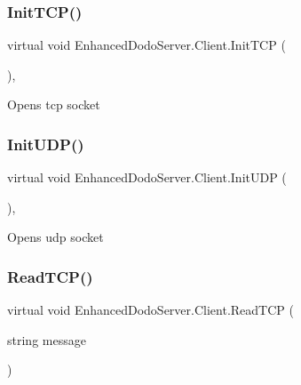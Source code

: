 \subsubsection{\texorpdfstring{InitTCP()}{InitTCP()}}
{\footnotesize\ttfamily virtual void Enhanced\+Dodo\+Server.\+Client.\+Init\+T\+CP (\begin{DoxyParamCaption}{ }\end{DoxyParamCaption})\hspace{0.3cm}{\ttfamily [protected]}, {\ttfamily [virtual]}}



Opens tcp socket 

\mbox{\label{class_enhanced_dodo_server_1_1_client_a37607b608dcd44136f90327643350fbc}} 
\subsubsection{\texorpdfstring{InitUDP()}{InitUDP()}}
{\footnotesize\ttfamily virtual void Enhanced\+Dodo\+Server.\+Client.\+Init\+U\+DP (\begin{DoxyParamCaption}{ }\end{DoxyParamCaption})\hspace{0.3cm}{\ttfamily [protected]}, {\ttfamily [virtual]}}



Opens udp socket 

\mbox{\label{class_enhanced_dodo_server_1_1_client_a17cf05d7a5f727e7eda92659dbba30a0}} 
\subsubsection{\texorpdfstring{ReadTCP()}{ReadTCP()}}
{\footnotesize\ttfamily virtual void Enhanced\+Dodo\+Server.\+Client.\+Read\+T\+CP (\begin{DoxyParamCaption}\item[{string}]{message }\end{DoxyParamCaption})\hspace{0.3cm}{\ttfamily [virtual]}}



